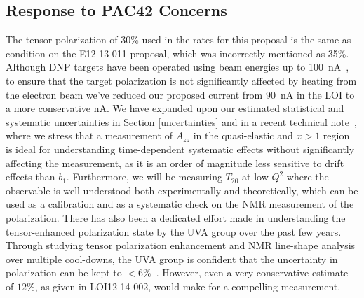 \subsection{Response to PAC42 Concerns}
The tensor polarization of 30\% used in the rates for this proposal is the same as condition on the E12-13-011 proposal, which was incorrectly mentioned as 35\%. Although DNP targets have been operated using beam energies up to 100~nA~\cite{Averett:1999nz, Pierce:2013pua}, to ensure that the target polarization is not significantly affected by heating from the electron beam we've reduced our proposed current from 90~nA in the LOI to a more conservative \CURRENT nA. We have expanded upon our estimated statistical and systematic uncertainties in Section \ref{uncertainties} and in a recent technical note~\cite{Keller:2015tn}, where we stress that a measurement of $A_{zz}$ in the quasi-elastic and $x>1$ region is ideal for understanding time-dependent systematic effects without significantly affecting the measurement, as it is an order of magnitude less sensitive to drift effects than $b_1$. Furthermore, we will be measuring $T_{20}$ at low $Q^2$ where the observable is well understood both experimentally and theoretically, which can be used as a calibration and as a systematic check on the NMR measurement of
the polarization. There has also been a dedicated effort made in understanding the tensor-enhanced polarization state by the UVA group over the past few years. Through studying tensor polarization enhancement and NMR line-shape analysis over multiple cool-downs, the UVA group is confident that the uncertainty in polarization can be kept to $<6\%$~\cite{keller2, keller3}. However, even a very conservative estimate of $12\%$, as given in LOI12-14-002, would make for a compelling measurement.

